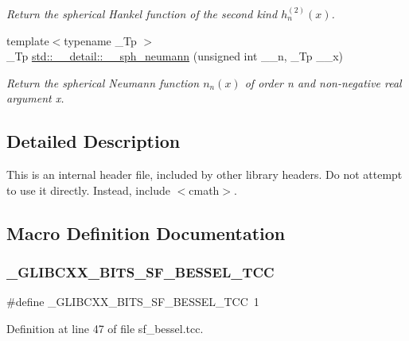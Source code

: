 \begin{DoxyCompactItemize}
\begin{DoxyCompactList}\small\item\em Return the spherical Hankel function of the second kind $ h^{(2)}_n(x) $. \end{DoxyCompactList}\item 
{\footnotesize template$<$typename \+\_\+\+Tp $>$ }\\\+\_\+\+Tp \hyperlink{namespacestd_1_1____detail_a94ac68003333b86b157a3b1e6ce44830}{std\+::\+\_\+\+\_\+detail\+::\+\_\+\+\_\+sph\+\_\+neumann} (unsigned int \+\_\+\+\_\+n, \+\_\+\+Tp \+\_\+\+\_\+x)
\begin{DoxyCompactList}\small\item\em Return the spherical Neumann function $ n_n(x) $ of order n and non-\/negative real argument {\ttfamily x}. \end{DoxyCompactList}\end{DoxyCompactItemize}


\subsection{Detailed Description}
This is an internal header file, included by other library headers. Do not attempt to use it directly. Instead, include $<$cmath$>$. 

\subsection{Macro Definition Documentation}
\mbox{\label{sf__bessel_8tcc_abd320ef9965fd609102634f0c12d2682}} 
\subsubsection{\texorpdfstring{\+\_\+\+G\+L\+I\+B\+C\+X\+X\+\_\+\+B\+I\+T\+S\+\_\+\+S\+F\+\_\+\+B\+E\+S\+S\+E\+L\+\_\+\+T\+CC}{\_GLIBCXX\_BITS\_SF\_BESSEL\_TCC}}
{\footnotesize\ttfamily \#define \+\_\+\+G\+L\+I\+B\+C\+X\+X\+\_\+\+B\+I\+T\+S\+\_\+\+S\+F\+\_\+\+B\+E\+S\+S\+E\+L\+\_\+\+T\+CC~1}



Definition at line 47 of file sf\+\_\+bessel.\+tcc.

